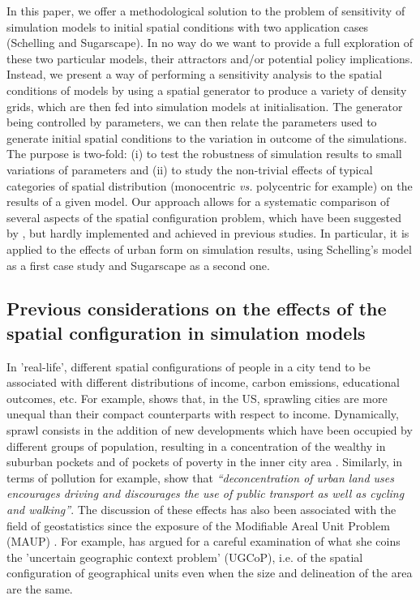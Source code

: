 \documentclass[preprint,5p,times,twocolumn,authoryear]{elsarticle}
\begin{document}
In this paper, we offer a methodological solution to the problem of sensitivity of simulation models to initial spatial conditions with two application cases (Schelling and Sugarscape). In no way do we want to provide a full exploration of these two particular models, their attractors and/or potential policy implications. Instead, we present a way of performing a sensitivity analysis to the spatial conditions of models by using a spatial generator to produce a variety of density grids, which are then fed into simulation models at initialisation. The generator being controlled by  parameters, we can then relate the parameters used to generate initial spatial conditions to the variation in outcome of the simulations. The purpose is two-fold: (i) to test the robustness of simulation results to small variations of  parameters and (ii) to study the non-trivial effects of typical categories of spatial distribution (monocentric \textit{vs.} polycentric for example) on the results of a given model. Our approach allows for a systematic comparison of several aspects of the spatial configuration problem, which have been suggested by \citet{filatova2013spatial}, but hardly implemented and achieved in previous studies. In particular, it is applied to the effects of urban form on simulation results, using Schelling's model as a first case study and Sugarscape as a second one. 

\subsection{Previous considerations on the effects of the spatial configuration in simulation models}



In 'real-life', different spatial configurations of people in a city tend to be associated with different distributions of income, carbon emissions, educational outcomes, etc. For example, \citet{wheeler2006urban} shows that, in the US, sprawling cities are more unequal than their compact counterparts with respect to income. Dynamically, sprawl consists in the addition of new developments which have been occupied by different groups of population, resulting in a concentration of the wealthy in suburban pockets and of pockets of poverty in the inner city area \citep{jargowsky2002sprawl}. Similarly, in terms of pollution for example, \citet[p.173]{schwanen2001travel} show that \textit{``deconcentration of urban land uses encourages driving and discourages the use of public transport as well as cycling and walking''}. The discussion of these effects has also been associated with the field of geostatistics since the exposure of the Modifiable Areal Unit Problem (MAUP) \citep{Openshaw1984, FotheringhamWong1991}. For example, \citet{Kwan2012} has argued for a careful examination of what she coins the 'uncertain geographic context problem' (UGCoP), i.e. of the spatial configuration of geographical units even when the size and delineation of the area are the same.\\
\end{document}
